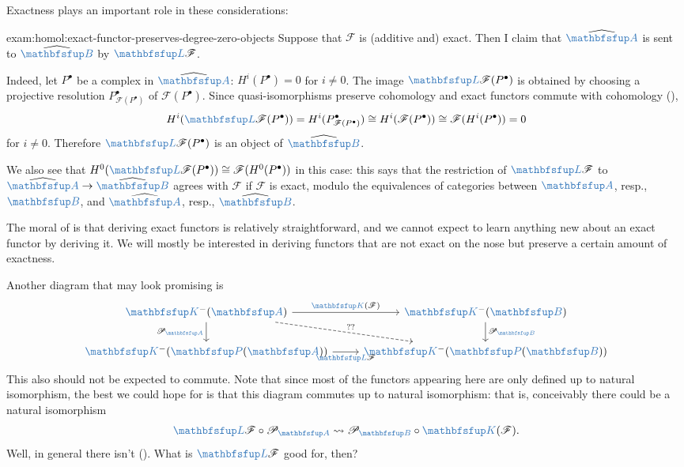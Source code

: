 Exactness plays an important role in these considerations:

\begin{exam}{}{exam:homol:exact-functor-preserves-degree-zero-objects}
  Suppose that $\mathscr{F}$ is (additive and) exact. Then I claim
  that $\widehat{\categ{A}}$ is sent to $\widehat{\categ{B}}$ by
  $\categ{L}\mathscr{F}$.

  Indeed, let $P^\bullet$ be a complex in $\widehat{\categ{A}}$:
  $H^i(P^\bullet) = 0$ for $i \ne 0$. The image
  $\categ{L}\mathscr{F}(P^\bullet)$ is obtained by choosing a
  projective resolution $P^\bullet_{\mathscr{F}(P^\bullet)}$ of
  $\mathscr{F}(P^\bullet)$. Since quasi-isomorphisms preserve
  cohomology and exact functors commute with cohomology
  (),
  \[
    H^i(\categ{L}\mathscr{F}(P^\bullet)) =
    H^i(P^\bullet_{\mathscr{F}(P^\bullet)}) \cong
    H^i(\mathscr{F}(P^\bullet)) \cong \mathscr{F}(H^i(P^\bullet)) = 0
  \]
  for $i \ne 0$. Therefore $\categ{L}\mathscr{F}(P^\bullet)$ is an
  object of $\widehat{\categ{B}}$.

  We also see that
  $H^0(\categ{L}\mathscr{F}(P^\bullet)) \cong
  \mathscr{F}(H^0(P^\bullet))$ in this case: this says that the
  restriction of $\categ{L}\mathscr{F}$ to
  $\widehat{\categ{A}} \to \widehat{\categ{B}}$ agrees with
  $\mathscr{F}$ if $\mathscr{F}$ is exact, modulo the equivalences of
  categories between $\categ{A}$, resp., $\categ{B}$, and
  $\widehat{\categ{A}}$, resp., $\widehat{\categ{B}}$.
\end{exam}

The moral of  is that deriving exact
functors is relatively straightforward, and we cannot expect to learn
anything new about an exact functor by deriving it. We will mostly be
interested in deriving functors that are not exact on the nose but
preserve a certain amount of exactness.

Another diagram that may look promising is
\[\begin{tikzcd}
    \categ{K}^-(\categ{A}) \arrow[r, "\categ{K}(\mathscr{F})"]
    \arrow[d, "\mathscr{P}_{\categ{A}}"'] \arrow[dr, dashed, "??"] &
    \categ{K}^-(\categ{B}) \arrow[d, "\mathscr{P}_{\categ{B}}"] \\
    \categ{K}^-(\categ{P}(\categ{A})) \arrow[r,
    "\categ{L}\mathscr{F}"'] & \categ{K}^-(\categ{P}(\categ{B}))
  \end{tikzcd}\] This also should not be expected to commute. Note
that since most of the functors appearing here are only defined up to
natural isomorphism, the best we could hope for is that this diagram
commutes up to natural isomorphism: that is, conceivably there could
be a natural isomorphism
\[
  \categ{L}\mathscr{F} \circ \mathscr{P}_{\categ{A}} \rightsquigarrow
  \mathscr{P}_{\categ{B}} \circ \categ{K}(\mathscr{F}).
\]
Well, in general there isn't
(). What
is $\categ{L}\mathscr{F}$ good for, then?

